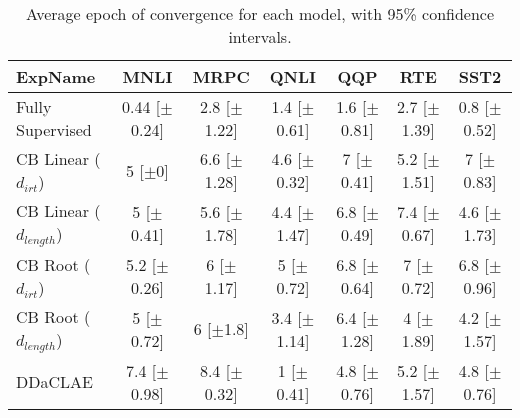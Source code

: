 \begin{table*}[ht]
\centering
\begingroup\small
\begin{tabular}{lcccccc}
  \hline
ExpName & MNLI & MRPC & QNLI & QQP & RTE & SST2 \\ 
  \hline
Fully Supervised & 0.44 [$\pm$0.24] & 2.8 [$\pm$1.22] & 1.4 [$\pm$0.61] & 1.6 [$\pm$0.81] & 2.7 [$\pm$1.39] & 0.8 [$\pm$0.52] \\ 
  CB Linear ($d_{irt}$) & 5 [$\pm$0] & 6.6 [$\pm$1.28] & 4.6 [$\pm$0.32] & 7 [$\pm$0.41] & 5.2 [$\pm$1.51] & 7 [$\pm$0.83] \\ 
  CB Linear ($d_{length}$) & 5 [$\pm$0.41] & 5.6 [$\pm$1.78] & 4.4 [$\pm$1.47] & 6.8 [$\pm$0.49] & 7.4 [$\pm$0.67] & 4.6 [$\pm$1.73] \\ 
  CB Root ($d_{irt}$) & 5.2 [$\pm$0.26] & 6 [$\pm$1.17] & 5 [$\pm$0.72] & 6.8 [$\pm$0.64] & 7 [$\pm$0.72] & 6.8 [$\pm$0.96] \\ 
  CB Root ($d_{length}$) & 5 [$\pm$0.72] & 6 [$\pm$1.8] & 3.4 [$\pm$1.14] & 6.4 [$\pm$1.28] & 4 [$\pm$1.89] & 4.2 [$\pm$1.57] \\ 
  DDaCLAE & 7.4 [$\pm$0.98] & 8.4 [$\pm$0.32] & 1 [$\pm$0.41] & 4.8 [$\pm$0.76] & 5.2 [$\pm$1.57] & 4.8 [$\pm$0.76] \\ 
   \hline
\end{tabular}
\endgroup
\caption{Average epoch of convergence for each model, with 95\% confidence intervals.} 
\label{tab:epoch_bert-True}
\end{table*}
